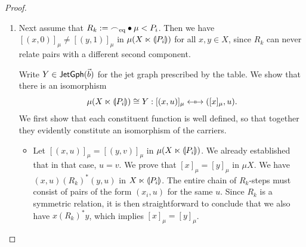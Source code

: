 \documentclass[a4paper]{memoir}
\begin{document}
\begin{proof}
\begin{enumerate}
\begin{itemize}
			\item[\framebox{$\leftarrow$}]
			Conversely, take $x, y \in X$ such that $[x]_\mu = [y]_\mu$.
			Then by the above reasoning in reverse, we deduce that $[(x, w)]_\mu = [(y, w)]_\mu$.
		\end{itemize}
		We now show that this isomorphism respects the $\ell$-jet relations in both directions, for $\ell \in \Deg(\vec b)$.
		Let $\jetsym_\ell \oriof \mu =: R'_{k'}$.
		Since $R'_{k'} \gg R_k \geq P_i$, we know that either $R'$ is symmetric, or $k' > i$.
		Either way, we have $x \mathrel{R'_{k'}} y \Leftrightarrow (x, 0) \mathrel{R'_{k'}} (y, 0) \Leftrightarrow (x, 0) \mathrel{R'_{k'}} (y, 0)$ in $X \multip \rival{P_i}$.
		Moreover, recall that since $\mu$ has a left adjoint, we have $R'_{k'} < \topsym$.
		\begin{itemize}
			\item[\framebox{$\to$}]
			Take a non-reflexive jet $[(x, u)]_\mu \jet_\ell [(y, v)]_\mu$ in $\mu(X \multip \rival{P_i})$.
			Then there exist representants, \WLOG{} $(x, u)$ and $(y, v)$, such that $(x, u) \mathrel{R'_{k'}} (y, v)$.
			Then either $x = y$ or $u = v$. Since the original jet was non-reflexive, $x \neq y$, so $u = v$.
			Then this is equivalent to $x \mathrel{R'_{k'}} y$, implying $[x]_\mu \jet_\ell [y]_\mu$.
			
			\item[\framebox{$\leftarrow$}]
			Take a non-reflexive jet $[x]_\mu \jet_\ell [y]_\mu$ in $\mu X$.
			Then there exist representants, \WLOG{} $x$ and $y$, such that $x \mathrel{R'_{k'}} y$.
			This is equivalent to $(x, 0) \mathrel{R'_{k'}} (y, 0)$, implying $[(x, 0)]_\mu \jet_\ell [(y, 0)]_\mu$.
		\end{itemize}
		
		\item Next assume that $R_k := {\frown}_{\mathrm{eq}} \mathbin{\bullet} \mu < P_i$.
		Then we have $[(x, 0)]_\mu \neq [(y, 1)]_\mu$ in $\mu(X \multip \rival{P_i})$ for all $x, y \in X$, since $R_k$ can never relate pairs with a different second component.
		
		Write $Y \in \mathsf{JetGph}(\vec b)$ for the jet graph prescribed by the table.
		We show that there is an isomorphism
		\[
			\mu(X \ltimes {\llparenthesis P_i \rrparenthesis}) \cong Y : [(x, u)]_\mu \mapsfrom \mapsto ([x]_\mu, u).
		\]
		We first show that each constituent function is well defined, so that together they evidently constitute an isomorphism of the carriers.
		\begin{itemize}
			\item[\framebox{$\to$}]
			Let $[(x, u)]_\mu = [(y, v)]_\mu$ in $\mu(X \multip \rival{P_i})$.
			We already established that in that case, $u = v$.
			We prove that $[x]_\mu = [y]_\mu$ in $\mu X$.
			We have $(x, u) \mathrel{(R_k)^*} (y, u)$ in $X \multip \rival{P_i}$.
			The entire chain of $R_k$-steps must consist of pairs of the form $(x_i, u)$ for the same $u$.
			Since $R_k$ is a symmetric relation, it is then straightforward to conclude that we also have $x \mathrel{(R_k)^*} y$, which implies $[x]_\mu = [y]_\mu$.
			

\end{itemize}
\end{enumerate}
\end{proof}
\end{document}
